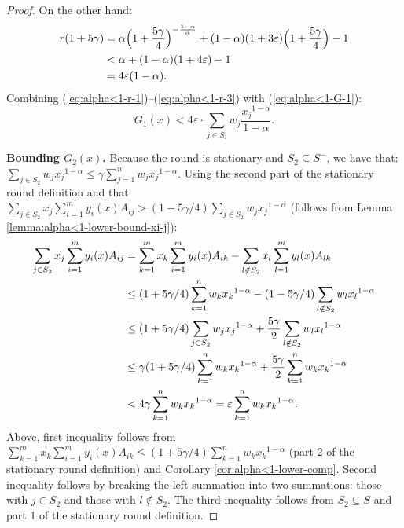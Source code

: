 \documentclass[11pt]{article}
\begin{document}
\begin{proof}
On the other hand:
\begin{align}
r(1+5\gamma) &= \alpha \Big(1+\frac{5\gamma}{4}\Big)^{-\frac{1-\alpha}{\alpha}} + (1-\alpha)(1+3\varepsilon)\Big(1+\frac{5\gamma}{4}\Big)-1\notag\\ 
&< \alpha + (1-\alpha)(1+4\varepsilon) - 1\notag\\
&=4\varepsilon(1-\alpha). \label{eq:alpha<1-r-3}
\end{align}
Combining (\ref{eq:alpha<1-r-1})--(\ref{eq:alpha<1-r-3}) with (\ref{eq:alpha<1-G-1}):
\begin{equation}
G_1(x) < 4\varepsilon\cdot \sum_{j\in S_1} w_j \frac{{x_j}^{1-\alpha}}{1-\alpha}. \label{eq:alpha<1-G-1-1}
\end{equation}

\noindent\textbf{Bounding $G_2(x)$.} Because the round is stationary and $S_2 \subseteq S^-$, we have that: $\sum_{j\in S_2}w_j {x_j}^{1-\alpha} \leq \gamma \sum_{j=1}^n w_j {x_j}^{1-\alpha}$. Using the second part of the stationary round definition and that $\sum_{j\in S_2}x_j\sum_{i=1}^m y_i(x)A_{ij}>(1-5\gamma/4)\sum_{j\in S_2}w_j {x_j}^{1-\alpha}$ (follows from Lemma \ref{lemma:alpha<1-lower-bound-xi-j}):
\begin{align}
\sum_{j\in S_2} x_j \sum_{i=1}^m y_i(x)A_{ij} &= \sum_{k=1}^m x_k\sum_{i=1}^m y_i(x)A_{ik} - \sum_{l\notin S_2} x_l \sum_{l=1}^m y_l(x)A_{lk}\notag\\
&\leq (1+5\gamma/4)\sum_{k=1}^n w_k {x_k}^{1-\alpha} - (1-5\gamma/4) \sum_{l\notin S_2} w_l {x_l}^{1-\alpha}\notag\\
&\leq (1+5\gamma/4)\sum_{j\in S_2} w_j {x_j}^{1-\alpha} + \frac{5\gamma}{2}\sum_{l\notin S_2} w_l {x_l}^{1-\alpha}\notag\\
&\leq \gamma(1+5\gamma/4)\sum_{k=1}^n w_k {x_k}^{1-\alpha} + \frac{5\gamma}{2}\sum_{k=1}^n w_k {x_k}^{1-\alpha}\notag\\
&< 4\gamma \sum_{k=1}^n w_k {x_k}^{1-\alpha} = \varepsilon \sum_{k=1}^n w_k {x_k}^{1-\alpha}. \label{eq:alpha<1-xjy-bound}
\end{align}
Above, first inequality follows from $\sum_{k=1}^m x_k\sum_{i=1}^m y_i(x)A_{ik} \leq (1+5\gamma/4)\sum_{k=1}^n w_k {x_k}^{1-\alpha}$ (part 2 of the stationary round definition) and Corollary \ref{cor:alpha<1-lower-comp}. Second inequality follows by breaking the left summation into two summations: those with $j\in S_2$ and those with $l\notin S_2$. The third inequality follows from $S_2 \subseteq S$ and part 1 of the stationary round definition.


\end{proof}
\end{document}
